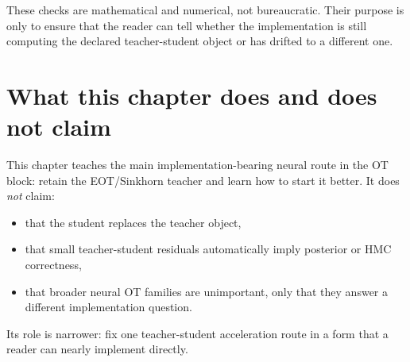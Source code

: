 These checks are mathematical and numerical, not bureaucratic.  Their purpose is
only to ensure that the reader can tell whether the implementation is still
computing the declared teacher-student object or has drifted to a different one.

\section{What this chapter does and does not claim}
\label{sec:bf-learned-ot-boundary}

This chapter teaches the main implementation-bearing neural route in the OT block:
retain the EOT/Sinkhorn teacher and learn how to start it better.  It does
\emph{not} claim:
\begin{itemize}
  \item that the student replaces the teacher object,
  \item that small teacher-student residuals automatically imply posterior or HMC
  correctness,
  \item that broader neural OT families are unimportant, only that they answer a
  different implementation question.
\end{itemize}
Its role is narrower: fix one teacher-student acceleration route in a form that a
reader can nearly implement directly.

\FloatBarrier
